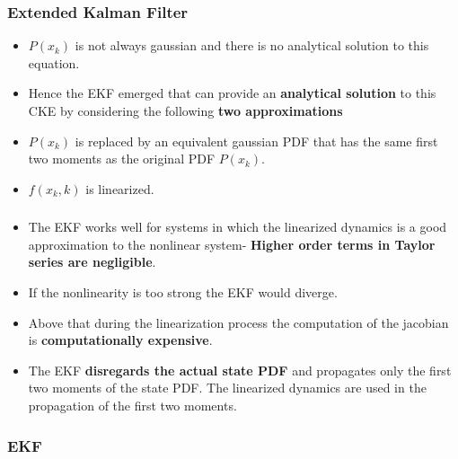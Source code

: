 \documentclass{beamer}
\begin{document}
\begin{frame}
\frametitle{Extended Kalman Filter}
\begin{itemize}[<+->]
	\item $P(x_k)$ is not always gaussian and there is no analytical solution to this equation. 
	\item Hence the EKF emerged that can provide an {\bf analytical solution} to this CKE by considering the following {\bf two approximations}
	\item $P(x_k)$ is replaced by an equivalent gaussian PDF that has the same first two moments as the original PDF $P(x_k)$.
  \item $f(x_k,k)$ is linearized.
\end{itemize}
\end{frame}
\begin{frame}
\frametitle{ }
\begin{itemize}[<+->]
  \item The EKF works well for systems in which the linearized dynamics is a good approximation to the nonlinear system- {\bf Higher order terms in Taylor series are negligible}. 
	\item If the nonlinearity is too strong the EKF would diverge. 
	\item Above that during the linearization process the computation of the jacobian is {\bf computationally expensive}. 
	\item The EKF {\bf disregards the actual state PDF} and propagates only the first two moments of the state PDF. The linearized dynamics are used in the propagation of the first two moments.
\end{itemize}
\end{frame}
\begin{frame}
\frametitle{EKF }



\end{frame}
\end{document}
